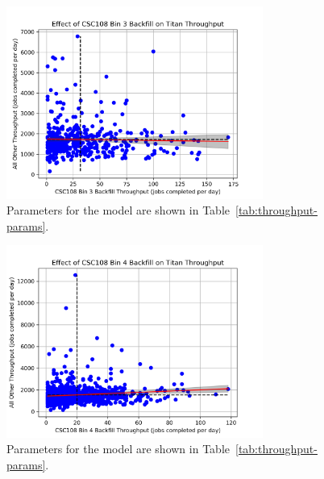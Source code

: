 \begin{figure}
  \includegraphics[width=0.75\textwidth]{images/linfit-throughput-bin3.png}
\caption{Parameters for the model are shown in
    Table~\ref{tab:throughput-params}.}
\label{fig:throughput-bin3}
\end{figure}

\begin{figure}
  \includegraphics[width=0.75\textwidth]{images/linfit-throughput-bin4.png}
\caption{Parameters for the model are shown in
    Table~\ref{tab:throughput-params}.}
\label{fig:throughput-bin4}
\end{figure}

